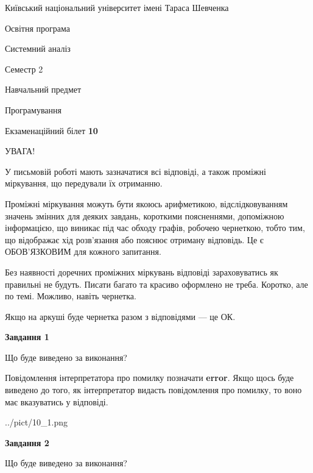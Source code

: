 \documentclass[12pt, ukrainian]{article}
\begin{document}
{{\begin {small}\par
{ \center  Київський національний університет імені Тараса Шевченка \par}
{\parbox {5 cm}{Освітня програма \hfill}{\parbox {7 cm}{Системний аналіз \hfill}}\parbox {6 cm}{\hfill Семестр 2}}\par
{\parbox {5 cm} {Навчальний предмет \hfill}\parbox {7 cm}{Програмування \hfill}\parbox {6cm}{\hfill}\par}\vspace{-7pt} \end{small}}{\center Екзаменаційний білет \No \textbf
{ 10 }\par}}
{
\begin {large}
УВАГА!

У письмовій роботі мають зазначатися всі відповіді, а також проміжні міркування, що передували їх отриманню.

Проміжні міркування можуть бути якоюсь арифметикою, відслідковуванням зна\-чень змінних для деяких завдань,
короткими поясненнями, допоміжною інформацією, що виникає під час обходу графів, робочею чернеткою,
тобто тим, що відображає хід розв’язання або пояснює отриману відповідь.
Це є ОБОВ’ЯЗКОВИМ для кожного запитання.

Без наявності доречних проміжних міркувань відповіді зараховуватись як правиль\-ні не будуть.
Писати багато та красиво оформлено не треба. Коротко, але по темі. Можли\-во, навіть чернетка.

Якщо на аркуші буде чернетка разом з відповідями --- це ОК.

\newpage

{\begin {center}\textbf{Завдання 1}\end {center}}\par
Що буде виведено за виконання?

Повідомлення інтерпретатора про помилку позначати \textbf{error}.
Якщо щось буде виведено до того, як інтерпретатор видасть повідомлення про помилку, 
то воно має вказуватись у відповіді. \par


\begin{center}
	{../pict/10_1.png}
\end{center}
\newpage

{\begin {center}\textbf{Завдання 2}\end {center}}\par
Що буде виведено за виконання?


\end{large}}
\end{document}

